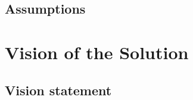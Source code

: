 \documentclass[11pt]{article}
\begin{document}
\subsection{Assumptions}


\section{Vision of the Solution}

\subsection{Vision statement}


\end{document}
